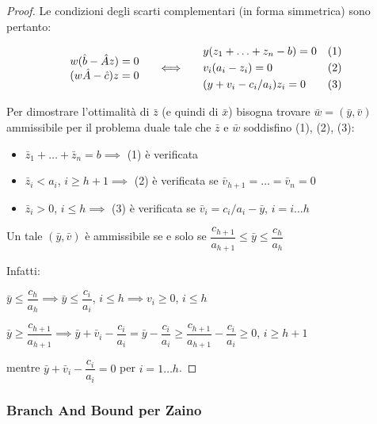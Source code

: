 \documentclass[a4paper,11pt]{book}
\theoremstyle{break}
\begin{document}
\begin{proof}
Le condizioni degli scarti complementari (in forma simmetrica) sono pertanto:

\[ \begin{matrix}
    w(\hat b - \hat A z) = 0\\
    (w\hat A - \hat c)z = 0
   \end{matrix} \hspace{.5cm} \iff \hspace{.5cm}
   \begin{aligned}
    &y(z_1 + \hdots + z_n - b) = 0& (1)\\
    &v_i(a_i - z_i) = 0 & (2)\\
    &(y+v_i-c_i/a_i)z_i = 0 & (3)
   \end{aligned}
 \]
 
 Per dimostrare l'ottimalità di $\bar z$ (e quindi di $\bar x$) bisogna trovare $\bar w = (\bar y, \bar v)$ ammissibile per il problema duale tale che $\bar z$ e $\bar w$ soddisfino (1), (2), (3):
 
 \begin{itemize}
  \item $\bar z_1 + \hdots + \bar z_n = b \implies$ (1) è verificata 
  \item $\bar z_i < a_i$, $i \geq h+1 \implies$ (2) è verificata se $\bar v_{h+1} = \hdots = \bar v_n = 0$
  \item $\bar z_i > 0$, $i \leq h \implies$ (3) è verificata se $\bar v_i = c_i/a_i - \bar y$, $i = i\hdots h$
 \end{itemize}
Un tale $(\bar y, \bar v)$ è ammissibile se e solo se $\dfrac{c_{h+1}}{a_{h+1}}\leq \bar y \leq \dfrac{c_h}{a_h}$

Infatti: 
\begin{center}
 
$\bar y \leq \dfrac{c_h}{a_h} \implies \bar y \leq \dfrac{c_i}{a_i}$, $i \leq h \implies v_i \geq 0$, $i \leq h$\smallskip


$\bar y \geq \dfrac{c_{h+1}}{a_{h+1}} \implies \bar y + \bar v_i - \dfrac{c_i}{a_i} = \bar y - \dfrac{c_i}{a_i} \geq \dfrac{c_{h+1}}{a_{h+1}} - \dfrac{c_i}{a_i} \geq 0$, $i \geq h+1$
\end{center}

mentre $\bar y + \bar v_i - \dfrac{c_i}{a_i} = 0$ per $i = 1 \hdots h$.

\end{proof}

\subsubsection{Branch And Bound per Zaino}
\end{document}

